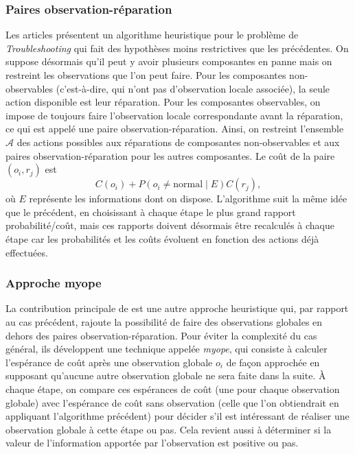 \documentclass[a4paper,11pt]{article}
\theoremstyle{plain}
\begin{document}
\subsubsection{Paires observation-réparation}

Les articles \cite{heckerman1994troubleshooting, Heckerman_1995} présentent un algorithme heuristique pour le problème de \emph{Troubleshooting} qui fait des hypothèses moins restrictives que les précédentes. On suppose désormais qu'il peut y avoir plusieurs composantes en panne mais on restreint les observations que l'on peut faire. Pour les composantes non-observables (c'est-à-dire, qui n'ont pas d'observation locale associée), la seule action disponible est leur réparation. Pour les composantes observables, on impose de toujours faire l'observation locale correspondante avant la réparation, ce qui est appelé une paire observation-réparation. Ainsi, on restreint l'ensemble $\mathcal A$ des actions possibles aux réparations de composantes non-observables et aux paires observation-réparation pour les autres composantes. Le coût de la paire $(o_i, r_j)$ est
\[C(o_i) + P(o_i \neq \text{normal} \mid E) C(r_j),\]
où $E$ représente les informations dont on dispose. L'algorithme suit la même idée que le précédent, en choisissant à chaque étape le plus grand rapport probabilité/coût, mais ces rapports doivent désormais être recalculés à chaque étape car les probabilités et les coûts évoluent en fonction des actions déjà effectuées.

\subsubsection{Approche myope}

La contribution principale de \cite{heckerman1994troubleshooting, Heckerman_1995} est une autre approche heuristique qui, par rapport au cas précédent, rajoute la possibilité de faire des observations globales en dehors des paires ob\-ser\-va\-tion-ré\-pa\-ra\-tion. Pour éviter la complexité du cas général, ils développent une technique appelée \emph{myope}, qui consiste à calculer l'espérance de coût après une observation globale $o_i$ de façon approchée en supposant qu'aucune autre observation globale ne sera faite dans la suite. À chaque étape, on compare ces espérances de coût (une pour chaque observation globale) avec l'espérance de coût sans observation (celle que l'on obtiendrait en appliquant l'algorithme précédent) pour décider s'il est intéressant de réaliser une observation globale à cette étape ou pas. Cela revient aussi à déterminer si la valeur de l'information apportée par l'observation est positive ou pas.
\end{document}
